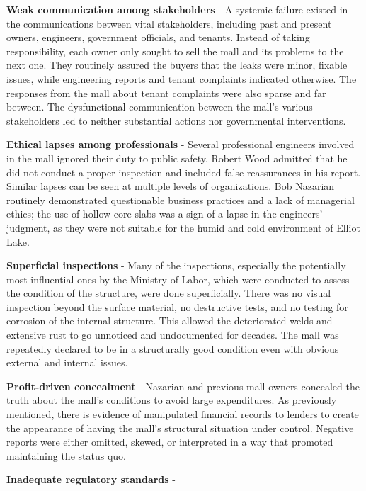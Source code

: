 \documentclass[12pt]{article}
\begin{document}
\textbf{Weak communication among stakeholders} - A systemic failure existed in the communications between vital stakeholders, including past and present owners, engineers, government officials, and tenants. Instead of taking responsibility, each owner only sought to sell the mall and its problems to the next one. They routinely assured the buyers that the leaks were minor, fixable issues, while engineering reports and tenant complaints indicated otherwise. The responses from the mall about tenant complaints were also sparse and far between. The dysfunctional communication between the mall's various stakeholders led to neither substantial actions nor governmental interventions.

\textbf{Ethical lapses among professionals} - Several professional engineers involved in the mall ignored their duty to public safety. Robert Wood admitted that he did not conduct a proper inspection and included false reassurances in his report. Similar lapses can be seen at multiple levels of organizations. Bob Nazarian routinely demonstrated questionable business practices and a lack of managerial ethics; the use of hollow-core slabs was a sign of a lapse in the engineers' judgment, as they were not suitable for the humid and cold environment of Elliot Lake. 

\textbf{Superficial inspections} - Many of the inspections, especially the potentially most influential ones by the Ministry of Labor, which were conducted to assess the condition of the structure, were done superficially. There was no visual inspection beyond the surface material, no destructive tests, and no testing for corrosion of the internal structure. This allowed the deteriorated welds and extensive rust to go unnoticed and undocumented for decades. The mall was repeatedly declared to be in a structurally good condition even with obvious external and internal issues.

\textbf{Profit-driven concealment} - Nazarian and previous mall owners concealed the truth about the mall's conditions to avoid large expenditures. As previously mentioned, there is evidence of manipulated financial records to lenders to create the appearance of having the mall's structural situation under control. Negative reports were either omitted, skewed, or interpreted in a way that promoted maintaining the status quo.

\textbf{Inadequate regulatory standards} - 
\end{document}
